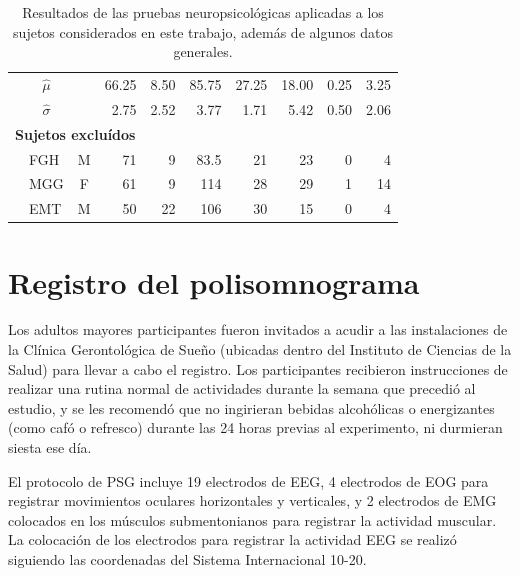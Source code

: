 \documentclass[12pt,a4paper]{mitthesis}
\begin{document}
\begin{table}
\begin{small}
\begin{tabular}{llcrrrrrrr}
\rowcolor{gris}
&\multicolumn{1}{c}{$\widehat{\mu}$} & 
              & 66.25& 8.50 & 85.75   & 27.25& 18.00& 0.25 & 3.25\\
\rowcolor{gris}
&\multicolumn{1}{c}{$\widehat{\sigma}$} & 
              & 2.75 & 2.52 & 3.77    & 1.71 & 5.42 & 0.50 & 2.06\\
\midrule
\multicolumn{6}{l}{\textbf{Sujetos exclu\'idos}}\\
&FGH    & M    & 71   & 9    & 83.5     & 21   & 23   & 0    & 4  \\
&MGG    & F    & 61   & 9    & 114      & 28   & 29   & 1    & 14 \\
&EMT    & M    & 50   & 22   & 106      & 30   & 15   & 0    & 4  \\
\bottomrule
\end{tabular} 
\end{small}
\label{tab_sujetos}
\caption{Resultados de las pruebas neuropsicol\'ogicas aplicadas a los sujetos considerados en este 
trabajo, adem\'as de algunos datos generales. 
}
\end{table}


\section{Registro del polisomnograma}

Los adultos mayores participantes fueron invitados a acudir a las instalaciones de la Cl\'inica 
Gerontol\'ogica de Sue\~no (ubicadas dentro del Instituto de Ciencias de la Salud) para llevar a 
cabo el registro. Los participantes recibieron instrucciones de realizar una rutina normal de 
actividades durante la semana que precedi\'o al estudio, y se les recomend\'o que no ingirieran 
bebidas alcoh\'olicas o energizantes (como caf\'o o refresco) durante las 24 horas previas al 
experimento, ni durmieran siesta ese d\'ia.

El protocolo de PSG incluye 19 electrodos de EEG, 4 electrodos de EOG para registrar movimientos 
oculares horizontales y verticales, y 2 electrodos de EMG colocados en los m\'usculos 
submentonianos para registrar la actividad muscular. 
La colocaci\'on de los electrodos para registrar la actividad EEG se realiz\'o siguiendo las 
coordenadas del Sistema Internacional 10-20\cite{Coleman87}.
\end{document}
